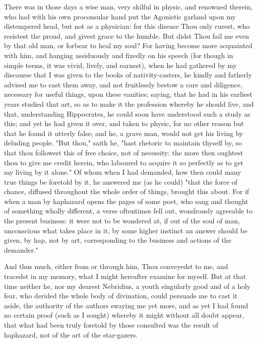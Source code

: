 \documentclass[b5paper,openright,12pt,twoside]{book}
\begin{document}
There was in those days a wise man, very skilful in physic, and renowned
therein, who had with his own proconsular hand put the Agonistic garland
upon my distempered head, but not as a physician: for this disease Thou
only curest, who resistest the proud, and givest grace to the humble.
But didst Thou fail me even by that old man, or forbear to heal my soul?
For having become more acquainted with him, and hanging assiduously and
fixedly on his speech (for though in simple terms, it was vivid, lively,
and earnest), when he had gathered by my discourse that I was given to
the books of nativity-casters, he kindly and fatherly advised me to cast
them away, and not fruitlessly bestow a care and diligence, necessary
for useful things, upon these vanities; saying, that he had in his
earliest years studied that art, so as to make it the profession whereby
he should live, and that, understanding Hippocrates, he could soon have
understood such a study as this; and yet he had given it over, and taken
to physic, for no other reason but that he found it utterly false;
and he, a grave man, would not get his living by deluding people. "But
thou," saith he, "hast rhetoric to maintain thyself by, so that thou
followest this of free choice, not of necessity: the more then oughtest
thou to give me credit herein, who laboured to acquire it so perfectly
as to get my living by it alone." Of whom when I had demanded, how then
could many true things be foretold by it, he answered me (as he could)
"that the force of chance, diffused throughout the whole order of
things, brought this about. For if when a man by haphazard opens the
pages of some poet, who sang and thought of something wholly different,
a verse oftentimes fell out, wondrously agreeable to the present
business: it were not to be wondered at, if out of the soul of man,
unconscious what takes place in it, by some higher instinct an answer
should be given, by hap, not by art, corresponding to the business and
actions of the demander."

And thus much, either from or through him, Thou conveyedst to me, and
tracedst in my memory, what I might hereafter examine for myself. But at
that time neither he, nor my dearest Nebridius, a youth singularly good
and of a holy fear, who derided the whole body of divination, could
persuade me to cast it aside, the authority of the authors swaying me
yet more, and as yet I had found no certain proof (such as I sought)
whereby it might without all doubt appear, that what had been truly
foretold by those consulted was the result of haphazard, not of the art
of the star-gazers.
\end{document}
